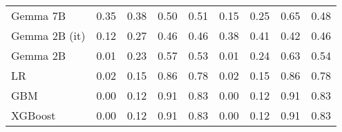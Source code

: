 \begin{tabular}{lllllllll}
Gemma 7B & \cellcolor{orange!25.0} 0.35 & \cellcolor{orange!25.0} 0.38 & \cellcolor{orange!1.6} 0.50 & 0.51 & 0.15 & 0.25 & 0.65 & \cellcolor{orange!4.1} 0.48 \\
Gemma 2B (it) & 0.12 & 0.27 & \cellcolor{orange!25.0} 0.46 & \cellcolor{orange!25.0} 0.46 & \cellcolor{orange!25.0} 0.38 & \cellcolor{orange!25.0} 0.41 & \cellcolor{orange!25.0} 0.42 & \cellcolor{orange!16.3} 0.46 \\
Gemma 2B & \cellcolor{cyan!25.0} 0.01 & 0.23 & 0.57 & 0.53 & \cellcolor{cyan!25.0} 0.01 & 0.24 & 0.63 & 0.54 \\
LR & 0.02 & 0.15 & 0.86 & 0.78 & 0.02 & 0.15 & 0.86 & 0.78 \\
GBM & 0.00 & 0.12 & 0.91 & 0.83 & 0.00 & 0.12 & 0.91 & 0.83 \\
XGBoost & 0.00 & 0.12 & 0.91 & 0.83 & 0.00 & 0.12 & 0.91 & 0.83 \\
\bottomrule
\end{tabular}

